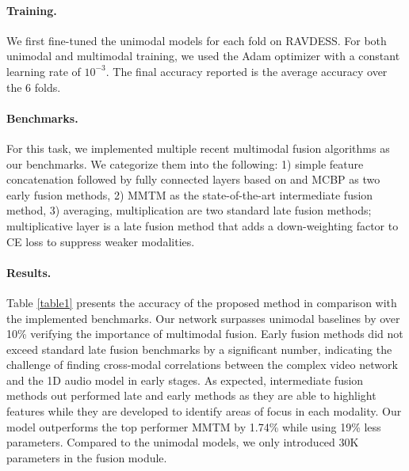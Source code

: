 \documentclass[10pt,twocolumn,letterpaper]{article}
\begin{document}
\paragraph{Training.}
We first fine-tuned the unimodal models for each fold on RAVDESS. For both unimodal and multimodal training, we used the Adam optimizer \cite{kingma2014adam} with a constant learning rate of $10^{-3}$. The final accuracy reported is the average accuracy over the 6 folds.  

\paragraph{Benchmarks.}
For this task, we implemented multiple recent multimodal fusion algorithms as our benchmarks. We categorize them into the following: 1) simple feature concatenation followed by fully connected layers based on \cite{ortega2019multimodal} and MCBP \cite{fukui2016multimodal} as two early fusion methods, 2) MMTM \cite{joze2020mmtm} as the state-of-the-art intermediate fusion method, 3) averaging, multiplication are two standard late fusion methods; multiplicative layer \cite{liu2018learn} is a late fusion method that adds a down-weighting factor to CE loss to suppress weaker modalities.

\paragraph{Results.}
Table \ref{table1} presents the accuracy of the proposed method in comparison with the implemented benchmarks. Our network surpasses unimodal baselines by over 10\% verifying the importance of multimodal fusion. Early fusion methods did not exceed standard late fusion benchmarks by a significant number, indicating the challenge of finding cross-modal correlations between the complex video network and the 1D audio model in early stages. As expected, intermediate fusion methods out performed late and early methods as they are able to highlight features while they are developed to identify areas of focus in each modality. Our model outperforms the top performer MMTM by 1.74\% while using 19\% less parameters. Compared to the unimodal models, we only introduced 30K parameters in the fusion module.
\end{document}
